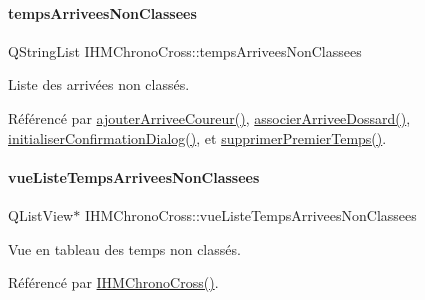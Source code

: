\paragraph{\texorpdfstring{temps\+Arrivees\+Non\+Classees}{tempsArriveesNonClassees}}
{\footnotesize\ttfamily Q\+String\+List I\+H\+M\+Chrono\+Cross\+::temps\+Arrivees\+Non\+Classees\hspace{0.3cm}{\ttfamily [private]}}



Liste des arrivées non classés. 



Référencé par \hyperlink{class_i_h_m_chrono_cross_a2ce63851d1f2723057ac649b7e320cfe}{ajouter\+Arrivee\+Coureur()}, \hyperlink{class_i_h_m_chrono_cross_a9f7f1ad130b60300a879694b6234f161}{associer\+Arrivee\+Dossard()}, \hyperlink{class_i_h_m_chrono_cross_a866a247fad23eca2af31ed985afe7cd3}{initialiser\+Confirmation\+Dialog()}, et \hyperlink{class_i_h_m_chrono_cross_aca8b5d6683a3ab0018066ec16968f3f3}{supprimer\+Premier\+Temps()}.

\mbox{\label{class_i_h_m_chrono_cross_aaf04338d882f708e57d9872b1c82b7a0}} 
\paragraph{\texorpdfstring{vue\+Liste\+Temps\+Arrivees\+Non\+Classees}{vueListeTempsArriveesNonClassees}}
{\footnotesize\ttfamily Q\+List\+View$\ast$ I\+H\+M\+Chrono\+Cross\+::vue\+Liste\+Temps\+Arrivees\+Non\+Classees\hspace{0.3cm}{\ttfamily [private]}}



Vue en tableau des temps non classés. 



Référencé par \hyperlink{class_i_h_m_chrono_cross_a479fc90733fba3e65fb06aa4a3adc02e}{I\+H\+M\+Chrono\+Cross()}.

\mbox{\label{class_i_h_m_chrono_cross_a199204276756844adbd6ca3c9030ad2f}} 
